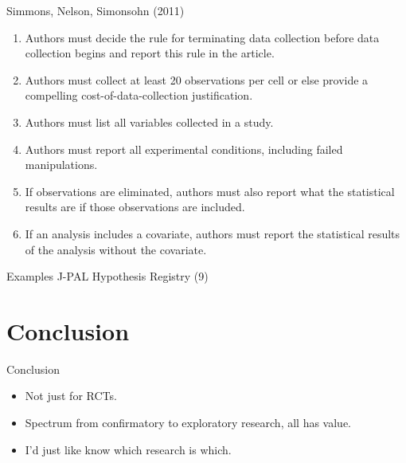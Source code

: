 \documentclass{beamer}
\begin{document}
\begin{frame}{Simmons, Nelson, Simonsohn (2011)}
\pause
\begin{enumerate}
\def\labelenumi{\arabic{enumi}.}
\item
  Authors must decide the rule for terminating data collection before
  data collection begins and report this rule in the article.
\item
  Authors must collect at least 20 observations per cell or else provide
  a compelling cost-of-data-collection justification.
\item
  Authors must list all variables collected in a study.
\item
  Authors must report all experimental conditions, including failed
  manipulations.
\item
  If observations are eliminated, authors must also report what the
  statistical results are if those observations are included.
\item
  If an analysis includes a covariate, authors must report the
  statistical results of the analysis without the covariate.
\end{enumerate}

\end{frame}

\begin{frame}{Examples}
J-PAL Hypothesis Registry (9)

\end{frame}

\section{Conclusion}
\begin{frame}{Conclusion}
 \begin{itemize}
 \item
  Not just for RCTs. 
 \item
  Spectrum from confirmatory to exploratory research, all has value.
 \item
  I'd just like know which research is which.
\end{itemize}

\end{frame}
\end{document}
